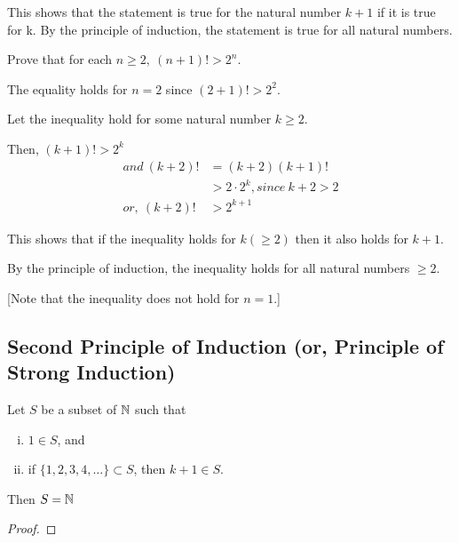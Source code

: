 \documentclass[11pt]{scrartcl}
\begin{document}
	This shows that the statement is true for the natural number $k+1$ if it is true for k. By the principle of induction, the statement is true for all natural numbers.
	
	\begin{example}
		Prove that for each $n \geq 2,\ (n+1)! > 2^{n}$.
	\end{example}

	The equality holds for $n=2$ since $(2+1)! > 2^{2}$.
	
	Let the inequality hold for some natural number $k \geq 2$.
	
	Then, $(k+1)! > 2^{k}$
	\begin{align*}
		and\ (k+2)! &= (k+2)(k+1)!\\
		&> 2 \cdot 2^{k}, since\ k+2>2\\
		or,\ (k+2)! &> 2^{k+1}
	\end{align*}

	This shows that if the inequality holds for $k(\geq 2)$ then it also holds for $k+1$.
	
	By the principle of induction, the inequality holds for all natural numbers $\geq 2$.
	
	[Note that the inequality does not hold for $n=1$.]
	
	\subsection{Second Principle of Induction (or, Principle of Strong Induction)}
	\begin{definition}
		Let $S$ be a subset of $\mathbb N$ such that
		\begin{enumerate}[(i)]
			\item $1 \in S$, and
			\item if $\{1,2,3,4,\dots\} \subset S$, then $k+1 \in S$.
		\end{enumerate}
		Then $S = \mathbb N$
	\end{definition}

	\begin{proof}
		
	\end{proof}
\end{document}

